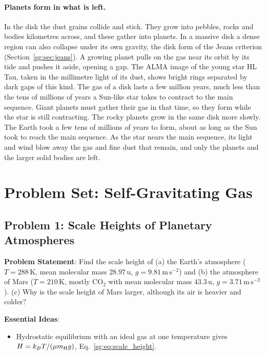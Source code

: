 \paragraph{Planets form in what is left.} In the disk the dust grains collide and stick. They grow into pebbles, rocks and bodies kilometres across, and these gather into planets. In a massive disk a dense region can also collapse under its own gravity, the disk form of the Jeans criterion (Section~\ref{sg:sec:jeans}). A growing planet pulls on the gas near its orbit by its tide and pushes it aside, opening a gap. The ALMA image of the young star HL Tau, taken in the millimetre light of its dust, shows bright rings separated by dark gaps of this kind. The gas of a disk lasts a few million years, much less than the tens of millions of years a Sun-like star takes to contract to the main sequence. Giant planets must gather their gas in that time, so they form while the star is still contracting. The rocky planets grow in the same disk more slowly. The Earth took a few tens of millions of years to form, about as long as the Sun took to reach the main sequence. As the star nears the main sequence, its light and wind blow away the gas and fine dust that remain, and only the planets and the larger solid bodies are left.

\section{Problem Set: Self-Gravitating Gas}

\subsection{Problem 1: Scale Heights of Planetary Atmospheres}
\label{sg:prob:scale}

\textbf{Problem Statement}: Find the scale height of (a) the Earth's atmosphere ($T=288\,\mathrm K$, mean molecular mass $28.97\,\mathrm u$, $g=9.81\,\mathrm{m\,s^{-2}}$) and (b) the atmosphere of Mars ($T=210\,\mathrm K$, mostly $\mathrm{CO_2}$ with mean molecular mass $43.3\,\mathrm u$, $g=3.71\,\mathrm{m\,s^{-2}}$). (c) Why is the scale height of Mars larger, although its air is heavier and colder?

\textbf{Essential Ideas}:
\begin{itemize}
	\item Hydrostatic equilibrium with an ideal gas at one temperature gives $H=k_BT/(\mu m_{\rm H}g)$, Eq.~\eqref{sg:eq:scale_height}.
\end{itemize}

